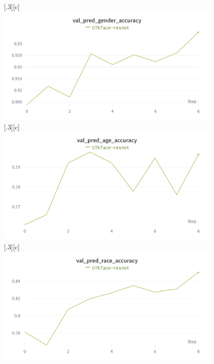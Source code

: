 \documentclass[DIV=calc, paper=a4, fontsize=10pt, twocolumn]{article}
\begin{document}
	\begin{figure}[t]
		\centering
		\subcaptionbox{}[.3\linewidth][c]{%
			\includegraphics[width=\linewidth]{imgs/UTKface-resnet-gender.png}}\quad
		\subcaptionbox{}[.3\linewidth][c]{%
			\includegraphics[width=\linewidth]{imgs/UTKface-resnet-age.png}}\quad
		\subcaptionbox{}[.3\linewidth][c]{%
			\includegraphics[width=\linewidth]{imgs/UTKface-resnet-race.png}}
		
		\bigskip
		

\end{figure}
\end{document}
